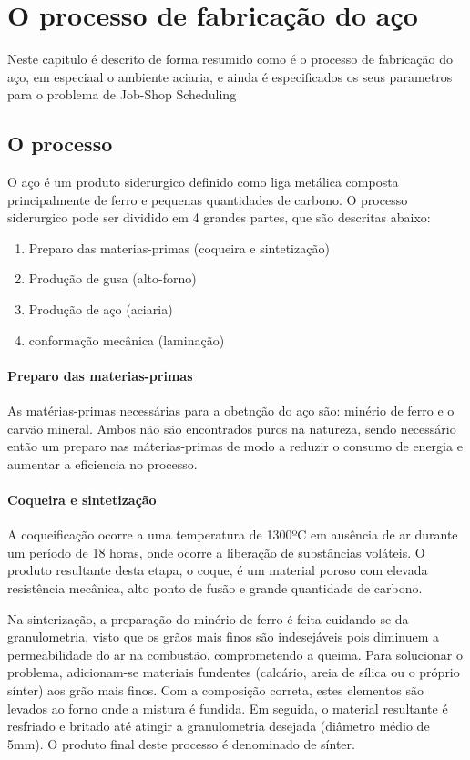 \chapter{O processo de fabricação do aço}
Neste capitulo é descrito de forma resumido como é o processo de fabricação do aço, em especiaal o ambiente aciaria, e ainda é especificados os seus parametros para o problema de Job-Shop Scheduling
\section{O processo}
\cite{UFPR} O aço é um produto siderurgico definido como liga metálica composta principalmente de ferro e pequenas quantidades de carbono. O processo siderurgico pode ser dividido em 4 grandes partes, que são descritas abaixo:
\begin {enumerate}
	\item Preparo das materias-primas (coqueira e sintetização)
	\item Produção de gusa (alto-forno)
	\item Produção de aço (aciaria)
	\item conformação mecânica (laminação)
\end{enumerate}

\subsubsection{Preparo das materias-primas}
As matérias-primas necessárias para a obetnção do aço são: minério de ferro e o carvão mineral. Ambos não são encontrados puros na natureza, sendo necessário então um preparo nas máterias-primas de modo a reduzir o consumo de energia e aumentar a eficiencia no processo.

\subsubsection{Coqueira e sintetização}
A coqueificação ocorre a uma temperatura de 1300ºC em ausência de ar durante um período de 18 horas, onde ocorre a liberação de substâncias voláteis. O produto resultante desta etapa, o coque, é um material poroso com elevada resistência mecânica, alto ponto de fusão e grande quantidade de carbono.

Na sinterização, a preparação do minério de ferro é feita cuidando-se da granulometria, visto que os grãos mais finos são indesejáveis pois diminuem a permeabilidade do ar na combustão, comprometendo a queima. Para solucionar o problema, adicionam-se materiais fundentes (calcário, areia de sílica ou o próprio sínter) aos grão mais finos.
Com a composição correta, estes elementos são levados ao forno onde a mistura é fundida. Em seguida, o material resultante é resfriado e britado até atingir a granulometria desejada (diâmetro médio de 5mm).
O produto final deste processo é denominado de sínter.

